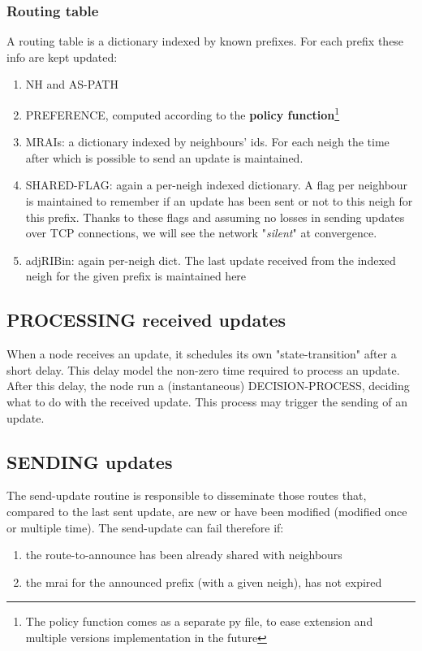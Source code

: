 \documentclass[fleqn,10pt]{SelfArx} %
\begin{document}
\subsubsection*{Routing table}
A routing table is a dictionary indexed by known prefixes. For each prefix these info are kept updated:
\begin{enumerate}[noitemsep]
  \item NH and AS-PATH
  \item PREFERENCE, computed according to the \textbf{policy function}\footnote{The policy function comes as a separate py file, to ease extension and multiple versions implementation in the future}
  \item MRAIs: a dictionary indexed by neighbours' ids. For each neigh the time after which is possible to send an update is maintained.
  \item SHARED-FLAG: again a per-neigh indexed dictionary. A flag per neighbour is maintained to remember if an update has been sent or not to this neigh for this prefix. Thanks to these flags and assuming no losses in sending updates over TCP connections, we will see the network "\textit{silent}" at convergence.
  \item adjRIBin: again per-neigh dict. The last update received from the indexed neigh for the given prefix is maintained here
\end{enumerate}

\subsection*{PROCESSING received updates}
When a node receives an update, it schedules its own "state-transition" after a short delay. This delay model the non-zero time required to process an update.
After this delay, the node run a (instantaneous) DECISION-PROCESS, deciding what to do with the received update. This process may trigger the sending of an update.

\subsection*{SENDING updates}
The send-update routine is responsible to disseminate those routes that, compared to the last sent update, are new or have been modified (modified once or multiple time).
The send-update can fail therefore if:
\begin{enumerate}[noitemsep]
  \item the route-to-announce has been already shared with neighbours
  \item the mrai for the announced prefix (with a given neigh), has not expired
\end{enumerate}
\end{document}

